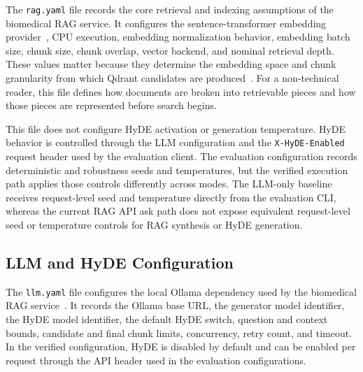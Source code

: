 The \texttt{rag.yaml} file records the core retrieval and indexing assumptions of the biomedical RAG service. It configures the sentence-transformer embedding provider~\cite{reimers2019sentencebert}, CPU execution, embedding normalization behavior, embedding batch size, chunk size, chunk overlap, vector backend, and nominal retrieval depth. These values matter because they determine the embedding space and chunk granularity from which Qdrant candidates are produced~\cite{qdrant2026collections}. For a non-technical reader, this file defines how documents are broken into retrievable pieces and how those pieces are represented before search begins.

This file does not configure HyDE activation or generation temperature. HyDE behavior is controlled through the LLM configuration and the \texttt{X-HyDE-Enabled} request header used by the evaluation client. The evaluation configuration records deterministic and robustness seeds and temperatures, but the verified execution path applies those controls differently across modes. The LLM-only baseline receives request-level seed and temperature directly from the evaluation CLI, whereas the current RAG API ask path does not expose equivalent request-level seed or temperature controls for RAG synthesis or HyDE generation.

\subsection{LLM and HyDE Configuration}

The \texttt{llm.yaml} file configures the local Ollama dependency used by the biomedical RAG service~\cite{ollama2026api}. It records the Ollama base URL, the generator model identifier, the HyDE model identifier, the default HyDE switch, question and context bounds, candidate and final chunk limits, concurrency, retry count, and timeout. In the verified configuration, HyDE is disabled by default and can be enabled per request through the API header used in the evaluation configurations.

